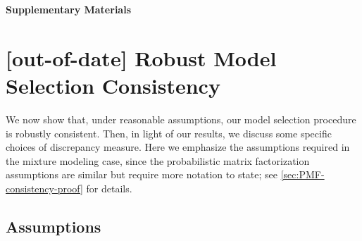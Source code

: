
\renewcommand{\thefigure}{\Alph{section}.\arabic{figure}}
\renewcommand{\thetable}{\Alph{section}.\arabic{table}}
\renewcommand{\thetheorem}{\Alph{section}.\arabic{theorem}}
\renewcommand{\thelemma}{\Alph{section}.\arabic{lemma}}


\begin{center}
    \LARGE \textbf{Supplementary Materials}
\end{center}

%	


\section{[out-of-date] Robust Model Selection Consistency} %
\label{sec:theory}


We now show that, under reasonable assumptions, our model selection procedure is robustly consistent.
Then, in light of our results, we discuss some specific choices of discrepancy measure.
Here we emphasize the assumptions required in the mixture modeling case, since the probabilistic matrix factorization assumptions are similar but require more notation to state;
see \cref{sec:PMF-consistency-proof} for details.

\subsection{Assumptions}



